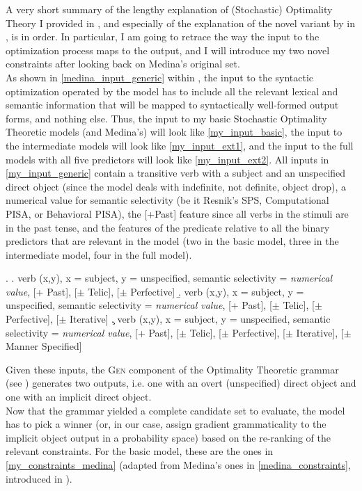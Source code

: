 A very short summary of the lengthy explanation of (Stochastic) Optimality Theory I provided in , and especially of the explanation of the novel variant by \textcite{Medina2007} in , is in order. In particular, I am going to retrace the way the input to the optimization process maps to the output, and I will introduce my two novel constraints after looking back on Medina's original set.\\
As shown in \ref{medina_input_generic} within , the input to the syntactic optimization operated by the model has to include all the relevant lexical and semantic information that will be mapped to syntactically well-formed output forms, and nothing else. Thus, the input to my basic Stochastic Optimality Theoretic models (and Medina's) will look like \ref{my_input_basic}, the input to the intermediate models will look like \ref{my_input_ext1}, and the input to the full models with all five predictors will look like \ref{my_input_ext2}. All inputs in \ref{my_input_generic} contain a transitive verb with a subject and an unspecified direct object (since the model deals with indefinite, not definite, object drop), a numerical value for semantic selectivity (be it Resnik's SPS, Computational PISA, or Behavioral PISA), the [+Past] feature since all verbs in the stimuli are in the past tense, and the features of the predicate relative to all the binary predictors that are relevant in the model (two in the basic model, three in the intermediate model, four in the full model).

\ex. \label{my_input_generic} 
\a. \label{my_input_basic} verb (x,y), x = subject, y = unspecified, semantic selectivity = \textit{numerical value}, [+ Past], [$\pm$ Telic], [$\pm$ Perfective]
\b. \label{my_input_ext1} verb (x,y), x = subject, y = unspecified, semantic selectivity = \textit{numerical value}, [+ Past], [$\pm$ Telic], [$\pm$ Perfective], [$\pm$ Iterative]
\c. \label{my_input_ext2} verb (x,y), x = subject, y = unspecified, semantic selectivity = \textit{numerical value}, [+ Past], [$\pm$ Telic], [$\pm$ Perfective], [$\pm$ Iterative], [$\pm$ Manner Specified]

Given these inputs, the \textsc{Gen} component of the Optimality Theoretic grammar (see ) generates two outputs, i.e. one with an overt (unspecified) direct object and one with an implicit direct object.\\
Now that the grammar yielded a complete candidate set to evaluate, the model has to pick a winner (or, in our case, assign gradient grammaticality to the implicit object output in a probability space) based on the re-ranking of the relevant constraints. For the basic model, these are the ones in \ref{my_constraints_medina} (adapted from Medina's ones in \ref{medina_constraints}, introduced in ).

